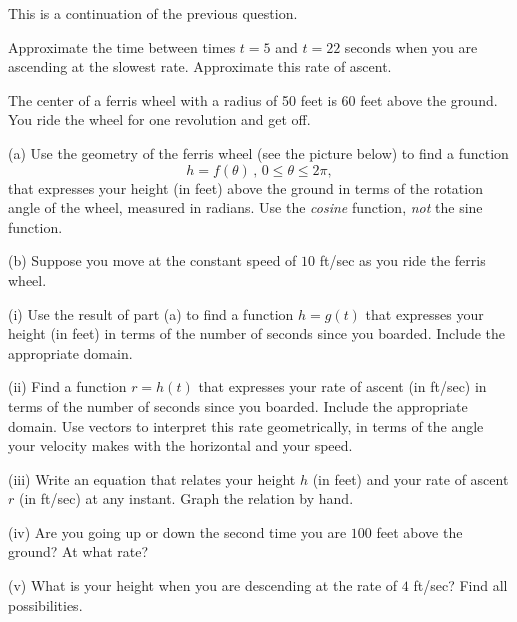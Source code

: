 \documentclass{ximera}
\begin{document}
\begin{question} \label{Q:3rerfggg}
This is a continuation of the previous question.

Approximate the time between times $t=5$ and $t=22$ seconds when you are ascending at the slowest rate. Approximate this rate of ascent. 

\end{question}

\begin{question}  \label{Q:Lkdefdsf99}
The center of a ferris wheel with a radius of 50 feet is 60 feet above the ground. You ride the wheel for one revolution and get off.

(a) Use the geometry of the ferris wheel (see the picture below) to find a function 
\[
 h = f(\theta) \, , \, 0\leq \theta \leq 2\pi ,
\] 
that expresses your height (in feet) above the ground in terms of the rotation angle of the wheel, measured in radians. Use the \emph{cosine} function, \emph{not} the sine function.

\begin{onlineOnly}
    \begin{center}
\end{center}
\end{onlineOnly}


(b) Suppose you move at the constant speed of $10$ ft/sec as you ride the ferris wheel.

(i) Use the result of part (a) to find a function $h=g(t)$ that expresses your height (in feet) in terms of the number of seconds since you boarded. Include the appropriate domain.

(ii) Find a function $r=h(t)$ that expresses your rate of ascent (in ft/sec) in terms of the number of seconds since you boarded. Include the appropriate domain. Use vectors to interpret this rate geometrically, in terms of the angle your velocity makes with the horizontal and your speed.

(iii) Write an equation that relates your height $h$ (in feet) and your rate of ascent $r$ (in ft/sec) at any instant. Graph the relation by hand.

(iv) Are you going up or down the second time you are $100$ feet above the ground? At what rate?

(v) What is your height when you are descending at the rate of $4$ ft/sec? Find all possibilities.

\end{question}
\end{document}
